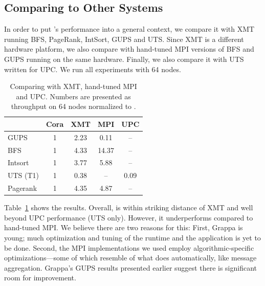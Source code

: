 \subsection{Comparing \Grappa to Other Systems}
\label{eval:mainperf}

In order to put \Grappa's performance into a general context, we compare it
with XMT running BFS, PageRank, IntSort, GUPS and UTS. Since XMT is a
different hardware platform, we also compare \Grappa with hand-tuned MPI
versions of BFS and GUPS running on the same hardware. Finally, we also
compare it with UTS written for UPC. We run all experiments with 64 nodes.


\begin{table}[htb]
\begin{center}
\begin{tabular}{l|c|c|c|c}
&	Cora &      XMT	&        MPI	&   UPC \\ \hline
GUPS	& 1	& 2.23	& 0.11& 	-- \\ 
BFS	& 1 &	4.33	& 14.37 & 	-- \\ 
Intsort	& 1	& 3.77 &	5.88	& -- \\
UTS (T1)	& 1	& 0.38	& -- &	0.09 \\ 
Pagerank	& 1	& 4.35	& 4.87 &	-- \\ 
\end{tabular}
\end{center}
\caption{Comparing \Grappa with XMT, hand-tuned MPI and UPC. Numbers are presented as throughput on 64 nodes normalized to \Grappa.}
\label{tab:grappa-comparisons}
\end{table}



Table~\ref{tab:grappa-comparisons} shows the results. Overall, \Grappa is
within striking distance of XMT and well beyond UPC performance (UTS only).
However, it underperforms compared to hand-tuned MPI. We believe there are two reasons for this:
First, Grappa is young; much optimization and tuning of the runtime
and the application is yet to be done. Second, the MPI implementations
we used employ algorithmic-specific optimizations---some of which
resemble of what \Grappa does automatically, like message aggregation.
Grappa's GUPS results presented earlier suggest there is significant
room for improvement.

